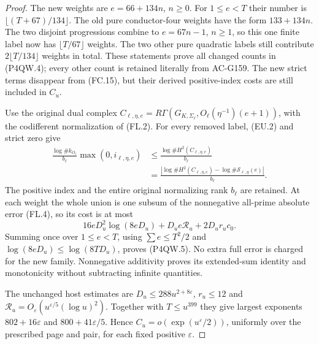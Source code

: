 \begin{proof}
The new weights are $e=66+134n$, $n\geq0$.
For $1\leq e<T$ their number is $\lfloor(T+67)/134\rfloor$.
The old pure conductor-four weights have the form $133+134n$.
The two disjoint progressions combine to $e=67n-1$, $n\geq1$,
so this one finite label now has $\lfloor T/67\rfloor$ weights.
The two other pure quadratic labels still contribute
$2\lfloor T/134\rfloor$ weights in total.
These statements prove all changed counts in (P4QW.4);
every other count is retained literally from AC-G159.
The new strict terms disappear from (FC.15), but their derived
positive-index costs are still included in $C_u$.

Use the original dual complex
$C_{\ell,\eta,e}=R\Gamma(G_{K,\Sigma_\ell},
O_\ell(\eta^{-1})(e+1))$, with the codifferent normalization
of (FL.2).  For every removed label, (EU.2) and strict zero give
\[
 \begin{aligned}
 \frac{\log\#k_{O_\ell}}{b_\ell}\max(0,i_{\ell,\eta,e})
 &\leq\frac{\log\#H^2(C_{\ell,\eta,e})}{b_\ell}\\
 &=\frac{|\log\#H^2(C_{\ell,\eta,e})
                  -\log\#\mathcal S_{\ell,\eta}(e)|}{b_\ell}.
 \end{aligned}
 \tag{P4QW.7}
\]
The positive index and the entire original normalizing rank
$b_\ell$ are retained.  At each weight the whole union is one
subsum of the nonnegative all-prime absolute error (FL.4),
so its cost is at most
\[
                  16eD_u^2\log(8eD_u)+D_ue\mathcal R_u+2D_ur_uc_0.
 \tag{P4QW.8}
\]
Summing once over $1\leq e<T$, using $\sum e\leq T^2/2$
and $\log(8eD_u)\leq\log(8TD_u)$, proves (P4QW.5).
No extra full error is charged for the new family.
Nonnegative additivity proves its extended-sum identity and
monotonicity without subtracting infinite quantities.

The unchanged host estimates are $D_u\leq288u^{2+8\varepsilon}$,
$r_u\leq12$ and
$\mathcal R_u=O_\varepsilon(u^{\varepsilon/5}(\log u)^2)$.
Together with $T\leq u^{399}$ they give largest exponents
$802+16\varepsilon$ and $800+41\varepsilon/5$.
Hence $C_u=o(\exp(u^\varepsilon/2))$, uniformly over the
prescribed page and pair, for each fixed positive $\varepsilon$.


\end{proof}
